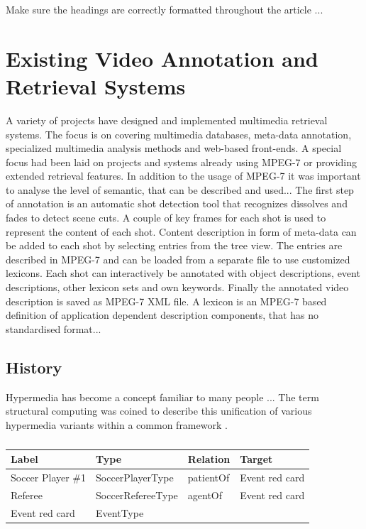 \documentclass[10pt, a4paper, oneside]{article}
\begin{document}
Make sure the headings are correctly formatted throughout the article ...

\section{Existing Video Annotation and Retrieval Systems}

A variety of projects have designed and implemented multimedia retrieval systems. The focus is on covering multimedia databases, meta-data annotation, specialized multimedia analysis methods and web-based front-ends. A special focus had been laid on projects and systems already using MPEG-7 or providing extended retrieval features. In addition to the usage of MPEG-7 it was important to analyse the level of semantic, that can be described and used... The first step of annotation is an automatic shot detection tool that recognizes dissolves and fades to detect scene cuts. A couple of key frames for each shot is used to represent the content of each shot. Content description in form of meta-data can be added to each shot by selecting entries from the tree view. The entries are described in MPEG-7 and can be loaded from a separate file to use customized lexicons. Each shot can interactively be annotated with object descriptions, event descriptions, other lexicon sets and own keywords. Finally the annotated video description is saved as MPEG-7 XML file. A lexicon is an MPEG-7 based definition of application dependent description components, that has no standardised format...

\subsection{History}

Hypermedia has become a concept familiar to many people ... The term
structural computing was coined to describe this unification of
various hypermedia variants within a common framework \cite{sc}.

\begin{table}[ht]
    \centering
    \setlength\tabcolsep{6pt}
    \begin{tabular}{ |l|l|l|l| }
        \hline
        \bfseries Label & \bfseries Type & \bfseries Relation & \bfseries Target \\ 
        \hline
        Soccer Player \#1 & SoccerPlayerType & patientOf & Event red card \\ 
        \hline
        Referee & SoccerRefereeType & agentOf & Event red card \\
        \hline
        Event red card & EventType && \\
        \hline
    \end{tabular}
    \caption{\fontsize{10pt}{11pt}}
    \label{table:1}
\end{table}
\end{document}
